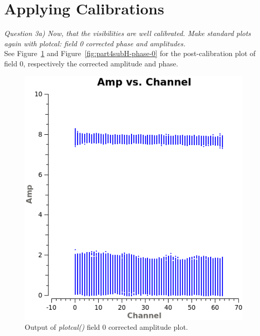 \documentclass[12pt, a4paper]{article}
\begin{document}
% 
% 

\section{Applying Calibrations}
\noindent \textit{Question 3a) Now, that the visibilities are well calibrated. Make standard plots again with plotcal: field 0 corrected phase and amplitudes. } \\
See Figure~\ref{fig:part4subH-amp-0} and Figure~\ref{fig:part4subH-phase-0} for the post-calibration plot of field 0, respectively the corrected amplitude and phase. \\
\newpage
\begin{figure}[h!]
    \centering
    \includegraphics[scale=0.5]{../Imaging/plots/part4-subH-question3_fld0-corrected-amp.png}
    \caption{Output of \emph{plotcal()} field 0 corrected amplitude plot. \label{fig:part4subH-amp-0}}
\end{figure}
\end{document}
